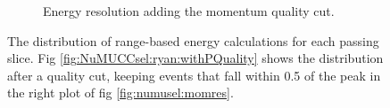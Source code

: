 \begin{figure}[]
\begin{center}
\begin{subfigure}[b]{0.45\textwidth}
    \caption{\label{fig:NuMUCCsel:ryan:Eres_withPQuality} Energy resolution adding the momentum quality cut.}
    \end{subfigure}
\caption{The distribution of range-based energy calculations for each passing slice. Fig \ref{fig:NuMUCCsel:ryan:withPQuality} shows the distribution after a quality cut, keeping events that fall within 0.5 of the peak in the right plot of fig \ref{fig:numusel:momres}.}
\label{fig:NuMUCCsel:ryan:PQuality}
\end{center}
\end{figure}

